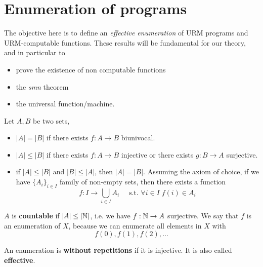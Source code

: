 \chapter{Enumeration of programs}
\newcommand{\pr}{\mathcal{PR}}
The objective here is to define an \emph{effective enumeration} of URM
programs and URM-computable functions. These results will be
fundamental for our theory, and in particular to
\begin{itemize}
\item prove the existence of non computable functions
\item the \textit{smn} theorem
\item the universal function/machine.
\end{itemize}

\begin{remark}
  Let $ A, B $ be two sets,
\begin{itemize}
\item $ |A| = |B| $ if there exists $  f:A\to B $ biunivocal.

\item $ |A| \leq |B| $ if there exists $ f:A\to B $ injective or
  there exists $g:B\to A$ surjective.

\item if $|A| \leq |B|$ and $|B| \leq |A|$, then $|A|=|B|$.
  Assuming the axiom of choice, if we have $\{A_i\}_{i \in I}$ family
  of non-empty sets, then
  there exists a function $$f:I \to \bigcup_{i \in I}A_i \quad
  \text{ s.t. }  \forall i \in I\; f(i) \in A_i$$
\end{itemize}
\end{remark}

\begin{definition}
  $A$ is \textbf{countable} if $ |A| \leq |\mathbb{N}| $, i.e. we have
$ f: \mathbb{N} \to A $ surjective. We say that
$f$ is an enumeration of $X$, because we can enumerate all
elements in $X$ with \[f(0), f(1), f(2), \dots \]
\end{definition}

\begin{definition}
  An enumeration is \textbf{without repetitions} if it is injective.
  It is also called \textbf{effective}.
\end{definition}

